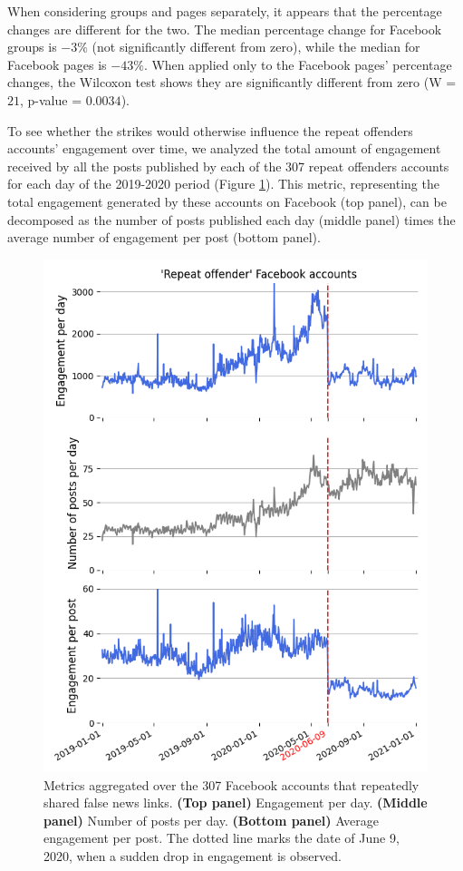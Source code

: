 \documentclass[11pt,a4paper]{article}
\begin{document}
When considering groups and pages separately, it appears that the percentage changes are different for the two. 
The median percentage change for Facebook groups is $-3\%$ (not significantly different from zero), while the median for Facebook pages is $-43\%$. 
When applied only to the Facebook pages' percentage changes, the Wilcoxon test shows they are significantly different from zero (W = $21$, p-value = $0.0034$).

To see whether the strikes would otherwise influence the repeat offenders accounts' engagement over time, we analyzed the total amount of engagement received by all the posts published by each of the 307 repeat offenders accounts for each day of the 2019-2020 period (Figure \ref{repeat_average_timeseries}). 
This metric, representing the total engagement generated by these accounts on Facebook (top panel), can be decomposed as the number of posts published each day (middle panel) times the average number of engagement per post (bottom panel).

\begin{figure}[!h]
\centering
\includegraphics[width=\linewidth]{./../figure/repeat_average_timeseries.png}
\caption{Metrics aggregated over the 307 Facebook accounts that repeatedly shared false news links. {\bf(Top panel)} Engagement per day. {\bf(Middle panel)} Number of posts per day. {\bf(Bottom panel)} Average engagement per post. The dotted line marks the date of June 9, 2020, when a sudden drop in engagement is observed.}
\label{repeat_average_timeseries}
\end{figure}
\end{document}
